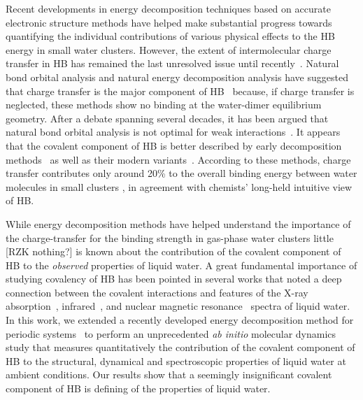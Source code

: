 \documentclass[aps,prl,reprint,amsmath,amssymb]{revtex4-1}
\begin{document}
Recent developments in energy decomposition techniques based on accurate electronic structure methods have helped make substantial progress towards quantifying the individual contributions of various physical effects to the HB energy in small water clusters. 
However, the extent of intermolecular charge transfer in HB has remained the last unresolved issue until recently~\cite{isaacs1999covalency,ghanty2000hydrogen,stone2017natural}. 
Natural bond orbital analysis\cite{weinhold1998natural} and natural energy decomposition analysis \cite{glendening1994natural} have suggested that charge transfer is the major component of HB~\cite{schenter1996natural,glendening2005natural,weinhold2005resonance} because, if charge transfer is neglected, these methods show no binding at the water-dimer equilibrium geometry. 
After a debate spanning several decades, it has been argued that natural bond orbital analysis is not optimal for weak interactions~\cite{stone2017natural}. 
It appears that the covalent component of HB is better described by early decomposition methods~\cite{kitaura1976new,bagus1984new,bagus1992decomposition,stevens1987frozen,chen1996energy,ZZZ-SAPT} as well as their modern variants~\cite{mo2000energy,misquitta2003dispersion,khaliullin2007unravelling}. 
According to these methods, charge transfer contributes only around 20\% to the overall binding energy between water molecules in small clusters \cite{stevens1987frozen,chen1996energy,piquemal2005csov,khaliullin2009electron,cobar2012examination}, in agreement with chemists' long-held intuitive view of HB.

While energy decomposition methods have helped understand the importance of the charge-transfer for the binding strength in gas-phase water clusters little [RZK nothing?] is known about the contribution of the covalent component of HB to the \emph{observed} properties of liquid water. 
A great fundamental importance of studying covalency of HB has been pointed in several works that  noted a deep connection between the covalent interactions and features of the X-ray absorption~\cite{NatureComm2013}, infrared~\cite{JPCL2013}, and nuclear magnetic resonance~\cite{NatureComm2015} spectra of liquid water. 
In this work, we extended a recently developed energy decomposition method for periodic systems~\cite{Khaliullin2013JCTC} to perform an unprecedented \emph{ab initio} molecular dynamics study that measures quantitatively the contribution of the covalent component of HB to the structural, dynamical and spectroscopic properties of liquid water at ambient conditions. 
Our results show that a seemingly insignificant covalent component of HB is defining of the properties of liquid water. 
\end{document}
